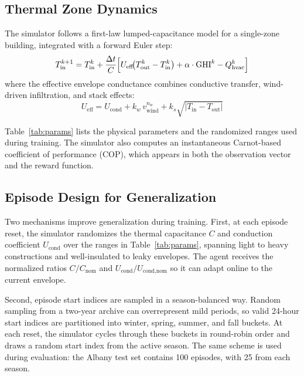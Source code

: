 \documentclass[conference]{IEEEtran}
\newcommand{\acCOP}{coefficient of performance (COP)}
\begin{document}
\subsection{Thermal Zone Dynamics}
\label{subsec:thermal-dynamics}

The simulator follows a first-law lumped-capacitance model for a
single-zone building, integrated with a forward Euler step:
%
\begin{equation}
\label{eq:thermal-ode}
T_{\text{in}}^{k+1} = T_{\text{in}}^{k}
+ \frac{\Delta t}{C}\Bigl[
U_{\text{eff}}\!\bigl(T_{\text{out}}^{k} - T_{\text{in}}^{k}\bigr)
+ \alpha \cdot \text{GHI}^{k}
- Q_{\text{hvac}}^{k}
\Bigr]
\end{equation}
%
where the effective envelope conductance combines conductive transfer,
wind-driven infiltration, and stack effects:
%
\begin{equation}
\label{eq:ueff}
U_{\text{eff}} = U_{\text{cond}}
+ k_w \, v_{\text{wind}}^{n_w}
+ k_s \sqrt{|T_{\text{in}} - T_{\text{out}}|}
\end{equation}

Table~\ref{tab:params} lists the physical parameters and the randomized
ranges used during training. The simulator also computes an instantaneous
Carnot-based \acCOP{}, which appears in both the observation vector and
the reward function.



\subsection{Episode Design for Generalization}
\label{subsec:episode-design}

Two mechanisms improve generalization during training. First, at each
episode reset, the simulator randomizes the thermal capacitance $C$ and
conduction coefficient $U_{\text{cond}}$ over the ranges in
Table~\ref{tab:params}, spanning light to heavy constructions and
well-insulated to leaky envelopes. The agent receives the normalized
ratios $C/C_{\text{nom}}$ and $U_{\text{cond}}/U_{\text{cond,nom}}$ so
it can adapt online to the current envelope.

Second, episode start indices are sampled in a season-balanced way.
Random sampling from a two-year archive can overrepresent mild periods,
so valid 24-hour start indices are partitioned into winter, spring,
summer, and fall buckets. At each reset, the simulator cycles through
these buckets in round-robin order and draws a random start index from
the active season. The same scheme is used during evaluation: the
Albany test set contains 100 episodes, with 25 from each season.
\end{document}
